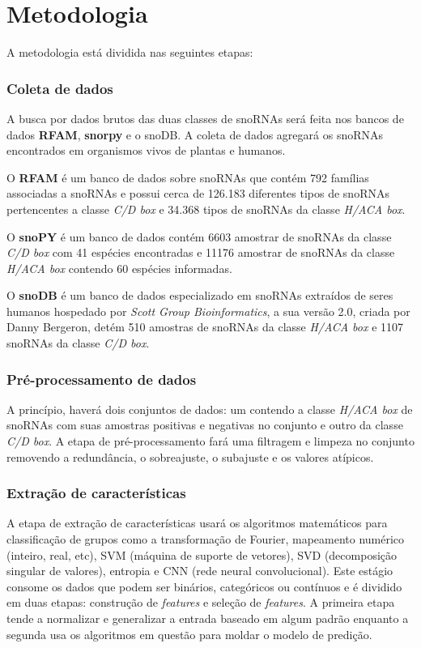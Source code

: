 \chapter{Metodologia}


A metodologia está dividida nas seguintes etapas:

\subsection{Coleta de dados}

A busca por dados brutos das duas classes de snoRNAs será feita nos bancos de dados \textbf{RFAM}, \textbf{snorpy} e o snoDB. A coleta de dados agregará os snoRNAs encontrados em organismos vivos de plantas e humanos.

O \textbf{RFAM} \cite{rfam} é um banco de dados sobre snoRNAs que contém 792 famílias associadas a snoRNAs e possui cerca de 126.183 diferentes tipos de snoRNAs pertencentes a classe \textit{C/D box} e 34.368 tipos de snoRNAs da classe \textit{H/ACA box}.

O \textbf{snoPY} \cite{snoPY} é um banco de dados contém 6603 amostrar de snoRNAs da classe \textit{C/D box} com 41 espécies encontradas e 11176 amostrar de snoRNAs da classe \textit{H/ACA box} contendo 60 espécies informadas.

O \textbf{snoDB} \cite{snoDB} é um banco de dados especializado em snoRNAs extraídos de seres humanos hospedado por \textit{Scott Group Bioinformatics}, a sua versão 2.0, criada por Danny Bergeron, detém 510 amostras de snoRNAs da classe \textit{H/ACA box} e 1107 snoRNAs da classe \textit{C/D box}.

\subsection{Pré-processamento de dados}

A princípio, haverá dois conjuntos de dados: um contendo a classe \textit{H/ACA box} de snoRNAs com suas amostras positivas e negativas no conjunto e outro da classe \textit{C/D box}. A etapa de pré-processamento fará uma filtragem e limpeza no conjunto removendo a redundância, o sobreajuste, o subajuste e os valores atípicos. \cite{pre-process-ml}

\subsection{Extração de características}
A etapa de extração de características usará os algoritmos matemáticos para classificação de grupos como a transformação de Fourier, mapeamento numérico (inteiro, real, etc), SVM (máquina de suporte de vetores), SVD (decomposição singular de valores), entropia e CNN (rede neural convolucional). Este estágio consome os dados que podem ser binários, categóricos ou contínuos e é dividido em duas etapas: construção de \textit{features} e seleção de \textit{features}. A primeira etapa tende a normalizar e generalizar a entrada baseado em algum padrão enquanto a segunda usa os algoritmos em questão para moldar o modelo de predição. \cite{feature-extraction}  

